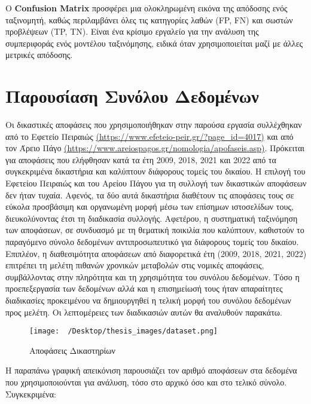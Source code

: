 \documentclass[diploma]{softlab-thesis}
\begin{document}
Ο \textbf{Confusion Matrix} προσφέρει μια ολοκληρωμένη εικόνα της απόδοσης ενός ταξινομητή, καθώς περιλαμβάνει όλες τις κατηγορίες λαθών (FP, FN) και σωστών προβλέψεων (TP, TN). Είναι ένα κρίσιμο εργαλείο για την ανάλυση της συμπεριφοράς ενός μοντέλου ταξινόμησης, ειδικά όταν χρησιμοποιείται μαζί με άλλες μετρικές απόδοσης.



\chapter{Παρουσίαση Συνόλου Δεδομένων}

\sloppy
Οι δικαστικές αποφάσεις που χρησιμοποιήθηκαν στην παρούσα εργασία συλλέχθηκαν από το Εφετείο Πειραιώς \href{https://www.efeteio-peir.gr/?page\_id=4017}{(https://www.efeteio-peir.gr/?page\_id=4017)} και από τον Άρειο Πάγο \href{https://www.areiospagos.gr/nomologia/apofaseis.asp}{(https://www.areiospagos.gr/nomologia/apofaseis.asp)}. 
Πρόκειται για αποφάσεις που ελήφθησαν κατά τα έτη 2009, 2018, 2021 και 2022 από τα συγκεκριμένα δικαστήρια και καλύπτουν διάφορους τομείς του δικαίου. 
Η επιλογή του Εφετείου Πειραιώς και του Αρείου Πάγου για τη συλλογή των δικαστικών αποφάσεων δεν ήταν τυχαία. Αφενός, τα δύο αυτά δικαστήρια διαθέτουν τις αποφάσεις τους σε εύκολα προσβάσιμη και οργανωμένη μορφή μέσω των επίσημων ιστοσελίδων τους, διευκολύνοντας έτσι τη διαδικασία συλλογής. Αφετέρου, η συστηματική ταξινόμηση των αποφάσεων, σε συνδυασμό με τη θεματική ποικιλία που καλύπτουν, καθιστούν το παραγόμενο σύνολο δεδομένων αντιπροσωπευτικό για διάφορους τομείς του δικαίου. Επιπλέον, η διαθεσιμότητα αποφάσεων από διαφορετικά έτη (2009, 2018, 2021, 2022) επιτρέπει τη μελέτη πιθανών χρονικών μεταβολών στις νομικές αποφάσεις, συμβάλλοντας στην πληρότητα και τη χρησιμότητα του συνόλου δεδομένων. Τόσο η προεπεξεργασία των δεδομένων αλλά και η επισημείωσή τους ήταν απαραίτητες διαδικασίες προκειμένου να δημιουργηθεί η τελική μορφή του συνόλου δεδομένων προς μελέτη. Οι λεπτομέρειες των διαδικασιών αυτών θα αναλυθούν παρακάτω.

\begin{figure}[h]
    \centering
    \texttt{[image: ~/Desktop/thesis\_images/dataset.png]} %
    \caption{Αποφάσεις Δικαστηρίων}
    \label{fig:your_image_label}
\end{figure}

Η παραπάνω γραφική απεικόνιση παρουσιάζει τον αριθμό αποφάσεων στα δεδομένα που χρησιμοποιούνται για ανάλυση, τόσο στο αρχικό όσο και στο τελικό σύνολο. Συγκεκριμένα:
\end{document}
